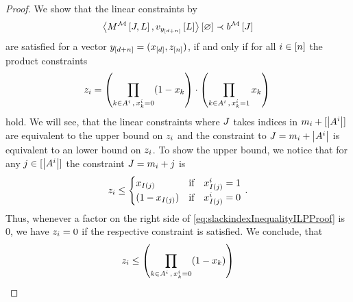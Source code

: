 \begin{proof}
    We show that the linear constraints by
    \begin{align*}
        \left\langle M^{\mathcal{M}}\left[J,L\right],v_{y_{[d+n]}}\left[L\right]\right\rangle \left[ \varnothing \right] \prec b^{\mathcal{M}}\left[J\right]
    \end{align*}
    are satisfied for a vector $y_{[d+n]}=(x_{[d]},z_{[n]})$, if and only if for all $i\in[n]$ the product constraints
    \begin{align}
        \label{eq:slackindexInequalityILPProof}
        z_{i}
        = \left( \prod_{k\in A^{i} \, , \,  x_{k}^{i} = 0} (1 - x_{k} \right)
        \cdot \left( \prod_{k\in A^{i} \, , \,  x_{k}^{i} = 1}  x_{k} \right) \,
    \end{align}
    hold.
    We will see, that the linear constraints where $J$ takes indices in $m_{i}+[\left|A^{i}\right|]$ are equivalent to the upper bound on $z_{i}$ and the constraint to $J=m_{i}+\left|A^{i}\right|$ is equivalent to an lower bound on $z_{i}$.
    To show the upper bound, we notice that for any $j\in[\left|A^{i}\right|]$ the constraint $J = m_{i}+j$ is
    \begin{align*}
        z_{i} \leq
        \begin{cases}
            x_{I(j)}  & \text{if}\quad x_{I(j)}^i = 1 \\
            (1- x_{I(j)}) & \text{if}\quad x_{I(j)}^i = 0 \\
        \end{cases} \, .
    \end{align*}
    Thus, whenever a factor on the right side of \eqref{eq:slackindexInequalityILPProof} is $0$, we have $z_{i}=0$ if the respective constraint is satisfied.
    We conclude, that
    \begin{align*}
        \slackindexof{\decindex}
        \leq \left( \prod_{\catenumerator\in\variablesetof{\decindex} \, , \,  \catindexof{\catenumerator}^\decindex = 0} (1 - \catindexof{\catenumerator}) \right)

\end{align*}
\end{proof}
